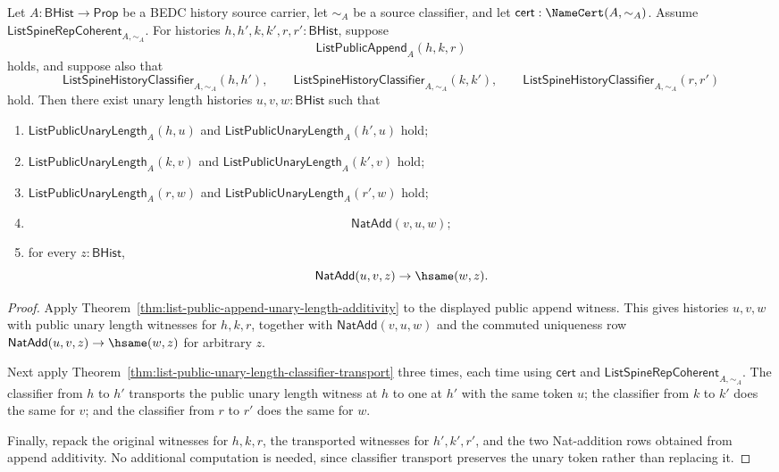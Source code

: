 \begin{theorem}
\label{thm:list-public-append-unary-length-classifier-transport}
Let $A:\mathsf{BHist}\to\mathsf{Prop}$ be a BEDC history source carrier, let
$\sim_A$ be a source classifier, and let
$\mathsf{cert}:\NameCert(A,\sim_A)$. Assume
$\mathsf{ListSpineRepCoherent}_{A,\sim_A}$. For histories
$h,h',k,k',r,r':\mathsf{BHist}$, suppose
$$
\mathsf{ListPublicAppend}_A(h,k,r)
$$
holds, and suppose also that
$$
\mathsf{ListSpineHistoryClassifier}_{A,\sim_A}(h,h'),\qquad
\mathsf{ListSpineHistoryClassifier}_{A,\sim_A}(k,k'),\qquad
\mathsf{ListSpineHistoryClassifier}_{A,\sim_A}(r,r')
$$
hold. Then there exist unary length histories $u,v,w:\mathsf{BHist}$ such that
\begin{enumerate}
  \item $\mathsf{ListPublicUnaryLength}_A(h,u)$ and
  $\mathsf{ListPublicUnaryLength}_A(h',u)$ hold;
  \item $\mathsf{ListPublicUnaryLength}_A(k,v)$ and
  $\mathsf{ListPublicUnaryLength}_A(k',v)$ hold;
  \item $\mathsf{ListPublicUnaryLength}_A(r,w)$ and
  $\mathsf{ListPublicUnaryLength}_A(r',w)$ hold;
  \item
  $$
  \mathsf{NatAdd}(v,u,w);
  $$
  \item for every $z:\mathsf{BHist}$,
  $$
  \mathsf{NatAdd}(u,v,z)\to\hsame(w,z).
  $$
\end{enumerate}
\end{theorem}
\begin{proof}
Apply Theorem~\ref{thm:list-public-append-unary-length-additivity} to the
displayed public append witness. This gives histories $u,v,w$ with public unary
length witnesses for $h,k,r$, together with
$\mathsf{NatAdd}(v,u,w)$ and the commuted uniqueness row
$\mathsf{NatAdd}(u,v,z)\to\hsame(w,z)$ for arbitrary $z$.

Next apply Theorem~\ref{thm:list-public-unary-length-classifier-transport}
three times, each time using $\mathsf{cert}$ and
$\mathsf{ListSpineRepCoherent}_{A,\sim_A}$. The classifier from $h$ to $h'$
transports the public unary length witness at $h$ to one at $h'$ with the same
token $u$; the classifier from $k$ to $k'$ does the same for $v$; and the
classifier from $r$ to $r'$ does the same for $w$.

Finally, repack the original witnesses for $h,k,r$, the transported witnesses
for $h',k',r'$, and the two Nat-addition rows obtained from append additivity.
No additional computation is needed, since classifier transport preserves the
unary token rather than replacing it.
\end{proof}
